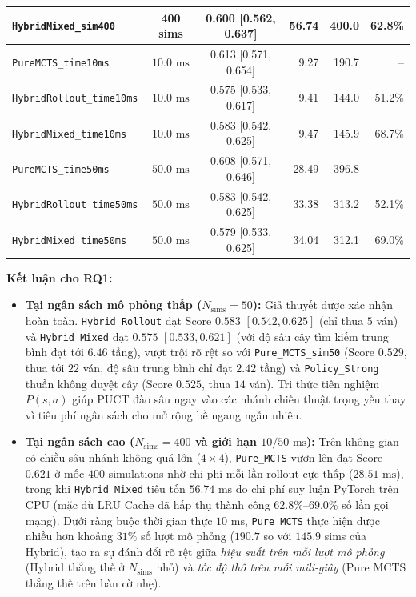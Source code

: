 \documentclass[a4paper,12pt]{report}
\begin{document}
\begin{table}[H]
\begin{tabular}{p{3.8cm}ccrrr}
\texttt{HybridMixed\_\allowbreak sim400} & 400 sims & 0.600 [0.562, 0.637] & 56.74 & 400.0 & 62.8\% \\
\midrule
\texttt{PureMCTS\_\allowbreak time10ms} & $10.0\text{ ms}$ & 0.613 [0.571, 0.654] & 9.27 & 190.7 & -- \\
\texttt{HybridRollout\_\allowbreak time10ms} & $10.0\text{ ms}$ & 0.575 [0.533, 0.617] & 9.41 & 144.0 & 51.2\% \\
\texttt{HybridMixed\_\allowbreak time10ms} & $10.0\text{ ms}$ & 0.583 [0.542, 0.625] & 9.47 & 145.9 & 68.7\% \\
\midrule
\texttt{PureMCTS\_\allowbreak time50ms} & $50.0\text{ ms}$ & 0.608 [0.571, 0.646] & 28.49 & 396.8 & -- \\
\texttt{HybridRollout\_\allowbreak time50ms} & $50.0\text{ ms}$ & 0.583 [0.542, 0.625] & 33.38 & 313.2 & 52.1\% \\
\texttt{HybridMixed\_\allowbreak time50ms} & $50.0\text{ ms}$ & 0.579 [0.533, 0.625] & 34.04 & 312.1 & 69.0\% \\
\bottomrule
\end{tabular}
\end{table}

\textbf{Kết luận cho RQ1:}
\begin{itemize}[leftmargin=1.2cm]
    \item \textbf{Tại ngân sách mô phỏng thấp ($N_{\text{sims}} = 50$):} Giả thuyết được xác nhận hoàn toàn. \texttt{Hybrid\_\allowbreak Rollout} đạt Score $0.583$ $[0.542, 0.625]$ (chỉ thua $5$ ván) và \texttt{Hybrid\_\allowbreak Mixed} đạt $0.575$ $[0.533, 0.621]$ (với độ sâu cây tìm kiếm trung bình đạt tới $6.46$ tầng), vượt trội rõ rệt so với \texttt{Pure\_\allowbreak MCTS\_\allowbreak sim50} (Score $0.529$, thua tới $22$ ván, độ sâu trung bình chỉ đạt $2.42$ tầng) và \texttt{Policy\_\allowbreak Strong} thuần không duyệt cây (Score $0.525$, thua $14$ ván). Tri thức tiên nghiệm $P(s, a)$ giúp PUCT đào sâu ngay vào các nhánh chiến thuật trọng yếu thay vì tiêu phí ngân sách cho mở rộng bề ngang ngẫu nhiên.
    \item \textbf{Tại ngân sách cao ($N_{\text{sims}} = 400$ và giới hạn $10 / 50\text{ ms}$):} Trên không gian có chiều sâu nhánh không quá lớn ($4 \times 4$), \texttt{Pure\_\allowbreak MCTS} vươn lên đạt Score $0.621$ ở mốc $400$ simulations nhờ chi phí mỗi lần rollout cực thấp ($28.51\text{ ms}$), trong khi \texttt{Hybrid\_\allowbreak Mixed} tiêu tốn $56.74\text{ ms}$ do chi phí suy luận PyTorch trên CPU (mặc dù LRU Cache đã hấp thụ thành công $62.8\%$--$69.0\%$ số lần gọi mạng). Dưới ràng buộc thời gian thực $10\text{ ms}$, \texttt{Pure\_\allowbreak MCTS} thực hiện được nhiều hơn khoảng $31\%$ số lượt mô phỏng ($190.7$ so với $145.9$ sims của Hybrid), tạo ra sự đánh đổi rõ rệt giữa \textit{hiệu suất trên mỗi lượt mô phỏng} (Hybrid thắng thế ở $N_{\text{sims}}$ nhỏ) và \textit{tốc độ thô trên mỗi mili-giây} (Pure MCTS thắng thế trên bàn cờ nhẹ).
\end{itemize}
\end{document}
